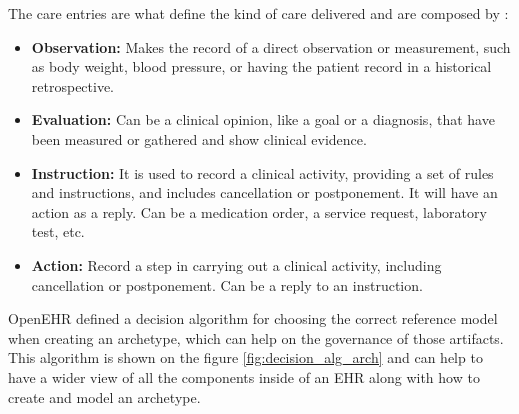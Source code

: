 \documentclass[mim_thesis.tex]{subfiles}
\begin{document}
The care entries are what define the kind of care delivered and are composed by \citep{openEHRCKM}:
\begin{itemize}[noitemsep]
\item \textbf{Observation:} Makes the record of a direct observation or measurement, such as body weight, blood pressure, or having the patient record in a historical retrospective.
\item \textbf{Evaluation:} Can be a clinical opinion, like a goal or a diagnosis, that have been measured or gathered and show clinical evidence.
\item \textbf{Instruction:} It is used to record a clinical activity, providing a set of rules and instructions, and includes cancellation or postponement. It will have an action as a reply. Can be a medication order, a service request, laboratory test, etc.
\item \textbf{Action:} Record a step in carrying out a clinical activity, including cancellation or postponement. Can be a reply to an instruction. 
\end{itemize}

OpenEHR defined a decision algorithm for choosing the correct reference model when creating an archetype, which can help on the governance of those artifacts. This algorithm is shown on the figure \ref{fig:decision_alg_arch} and can help to have a wider view of all the components inside of an EHR along with how to create and model an archetype.
\end{document}
